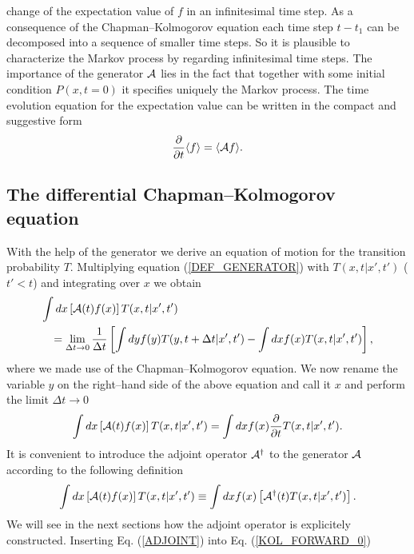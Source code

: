 change of the expectation value of $f$ in an infinitesimal time 
step. As a consequence of the Chapman--Kolmogorov equation each time 
step $t-t_1$ can be decomposed into a sequence of smaller time 
steps. So it is plausible to characterize the Markov
process by regarding infinitesimal time steps. 
The importance of the generator ${\cal{A}}$ lies in the fact
that together with some initial condition $P(x,t=0)$ it specifies
uniquely the Markov process.
The time evolution equation for the expectation value can be written 
in the compact and suggestive form
\begin{equation}
\label{EQ_EXPECTATION}
\frac{\partial}{\partial t} \langle f \rangle = 
\langle {\cal{A}} f \rangle.
\end{equation}


\subsection{The differential Chapman--Kolmogorov equation}
With the help of the generator we derive an equation of motion for
the transition probability $T$.
Multiplying equation (\ref{DEF_GENERATOR}) 
with $T(x,t|x',t')$ ($t'<t$) and 
integrating over $x$ we obtain
\begin{eqnarray*}
\lefteqn{\int dx \left[ {\cal{A}}(t) f(x) \right] T(x,t|x',t')} \\
&& = \lim_{\Delta t \rightarrow 0}
    \frac{1}{\Delta t} 
    \left[\int dy f(y)T(y,t+\Delta t|x',t') - 
        \int dx f(x) T(x,t|x',t')  \right],
\end{eqnarray*}
where we made use of the Chapman--Kolmogorov equation.
We now rename the variable $y$ on the right--hand side of the above 
equation and call it $x$ and perform the limit $\Delta t \rightarrow 
0$
\begin{equation}
\label{KOL_FORWARD_0}
\int dx \left[ {\cal{A}}(t) f(x) \right] T(x,t|x',t') =
  \int dx f(x) \frac{\partial}{\partial t} T(x,t|x',t').
\end{equation}
It is convenient to introduce the adjoint operator ${\cal{A}}^{\dagger}$
to the generator ${\cal{A}}$ according to the following definition
\begin{equation}
\label{ADJOINT}
\int dx \left[ {\cal{A}}(t) f(x) \right] T(x,t|x',t') \equiv
\int dx f(x) \left[ {\cal{A}}^{\dagger}(t)  T(x,t|x',t') \right].
\end{equation}
We will see in the next sections how the adjoint operator is
explicitely constructed.
Inserting Eq. (\ref{ADJOINT}) into Eq. (\ref{KOL_FORWARD_0})
